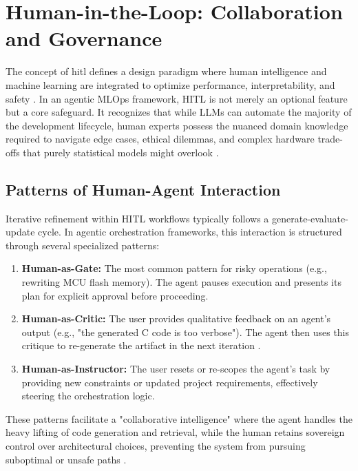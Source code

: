 \section{Human-in-the-Loop: Collaboration and Governance}
The concept of \gls{hitl} defines a design paradigm where human intelligence and machine learning are integrated to optimize performance, interpretability, and safety \cite{chaudhari2024rlhfdecipheredcriticalanalysis}. In an agentic MLOps framework, HITL is not merely an optional feature but a core safeguard. It recognizes that while LLMs can automate the majority of the development lifecycle, human experts possess the nuanced domain knowledge required to navigate edge cases, ethical dilemmas, and complex hardware trade-offs that purely statistical models might overlook \cite{HelpfulHarmlessHonest2025}.

\subsection{Patterns of Human-Agent Interaction}
Iterative refinement within HITL workflows typically follows a generate-evaluate-update cycle. In agentic orchestration frameworks, this interaction is structured through several specialized patterns:
\begin{enumerate}
    \item \textbf{Human-as-Gate:} The most common pattern for risky operations (e.g., rewriting MCU flash memory). The agent pauses execution and presents its plan for explicit approval before proceeding.
    \item \textbf{Human-as-Critic:} The user provides qualitative feedback on an agent's output (e.g., "the generated C code is too verbose"). The agent then uses this critique to re-generate the artifact in the next iteration \cite{wang2022hitl_survey, madaan2023selfrefine}.
    \item \textbf{Human-as-Instructor:} The user resets or re-scopes the agent's task by providing new constraints or updated project requirements, effectively steering the orchestration logic.
\end{enumerate}
These patterns facilitate a "collaborative intelligence" where the agent handles the heavy lifting of code generation and retrieval, while the human retains sovereign control over architectural choices, preventing the system from pursuing suboptimal or unsafe paths \cite{xue2025improve}.

